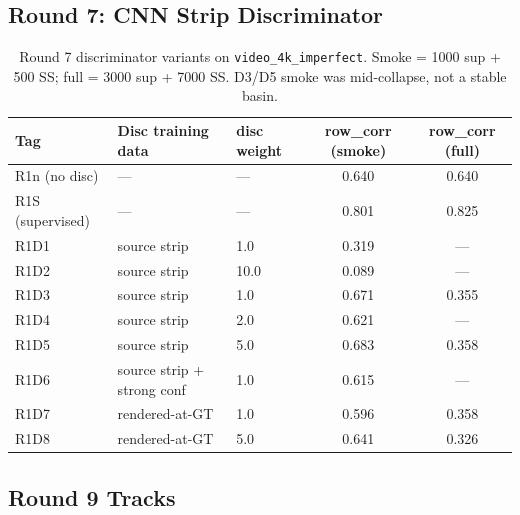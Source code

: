 \documentclass[11pt,a4paper]{article}
\begin{document}
\subsection{Round 7: CNN Strip Discriminator}

\begin{table}[H]
\centering
\small
\begin{tabular}{lllcc}
\toprule
Tag & Disc training data & disc weight & row\_corr (smoke) & row\_corr (full) \\
\midrule
R1n (no disc) & --- & --- & 0.640 & 0.640 \\
R1S (supervised) & --- & --- & 0.801 & 0.825 \\
R1D1 & source strip & 1.0 & 0.319 & --- \\
R1D2 & source strip & 10.0 & 0.089 & --- \\
R1D3 & source strip & 1.0 & 0.671 & 0.355 \\
R1D4 & source strip & 2.0 & 0.621 & --- \\
R1D5 & source strip & 5.0 & 0.683 & 0.358 \\
R1D6 & source strip + strong conf & 1.0 & 0.615 & --- \\
R1D7 & rendered-at-GT & 1.0 & 0.596 & 0.358 \\
R1D8 & rendered-at-GT & 5.0 & 0.641 & 0.326 \\
\bottomrule
\end{tabular}
\caption{Round 7 discriminator variants on \texttt{video\_4k\_imperfect}. Smoke = 1000 sup + 500 SS; full = 3000 sup + 7000 SS. D3/D5 smoke was mid-collapse, not a stable basin.}
\end{table}

\subsection{Round 9 Tracks}
\end{document}
